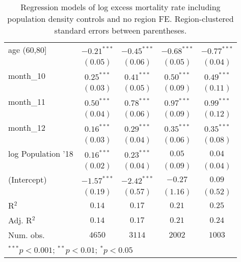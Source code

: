 \begin{table}[h!]
\begin{center}
\begin{small}
\begin{tabular}{l c c c c}
age (60,80]        & $-0.21^{***}$ & $-0.45^{***}$ & $-0.68^{***}$ & $-0.77^{***}$ \\
                   & $(0.05)$      & $(0.06)$      & $(0.05)$      & $(0.04)$      \\
month\_10          & $0.25^{***}$  & $0.41^{***}$  & $0.50^{***}$  & $0.49^{***}$  \\
                   & $(0.03)$      & $(0.05)$      & $(0.09)$      & $(0.11)$      \\
month\_11          & $0.50^{***}$  & $0.78^{***}$  & $0.97^{***}$  & $0.99^{***}$  \\
                   & $(0.04)$      & $(0.06)$      & $(0.09)$      & $(0.12)$      \\
month\_12          & $0.16^{***}$  & $0.29^{***}$  & $0.35^{***}$  & $0.35^{***}$  \\
                   & $(0.03)$      & $(0.04)$      & $(0.06)$      & $(0.08)$      \\
log Population '18 & $0.16^{***}$  & $0.23^{***}$  & $0.05$        & $0.04$        \\
                   & $(0.02)$      & $(0.04)$      & $(0.09)$      & $(0.04)$      \\
(Intercept)        & $-1.57^{***}$ & $-2.42^{***}$ & $-0.27$       & $0.09$        \\
                   & $(0.19)$      & $(0.57)$      & $(1.16)$      & $(0.52)$      \\
\hline
R$^2$              & $0.14$        & $0.17$        & $0.21$        & $0.25$        \\
Adj. R$^2$         & $0.14$        & $0.17$        & $0.21$        & $0.24$        \\
Num. obs.          & $4650$        & $3114$        & $2002$        & $1003$        \\
\hline
\multicolumn{5}{l}{\tiny{$^{***}p<0.001$; $^{**}p<0.01$; $^{*}p<0.05$}}
\end{tabular}
\end{small}
\caption{Regression models of log excess mortality rate including population density controls and no region FE. Region-clustered standard errors between parentheses.}
\label{tab:popdensmodels}
\end{center}
\end{table}

